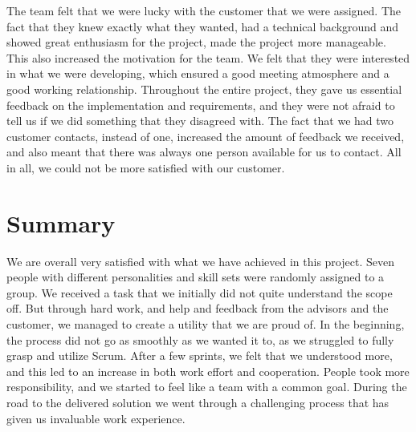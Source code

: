 The team felt that we were lucky with the customer that we were assigned.
The fact that they knew exactly what they wanted, had a technical background and showed great enthusiasm for the project, made the project more manageable. This also increased the motivation for the team. We felt that they were interested in what we were developing, which ensured a good meeting atmosphere and a good working relationship. Throughout the entire project, they gave us essential feedback on the implementation and requirements, and they were not afraid to tell us if we did something that they disagreed with. The fact that we had two customer contacts, instead of one, increased the amount of feedback we received, and also meant that there was always one person available for us to contact. All in all, we could not be more satisfied with our customer.

\section{Summary}
We are overall very satisfied with what we have achieved in this project. Seven people with different personalities and skill sets were randomly assigned to a group. We received a task that we initially did not quite understand the scope off. But through hard work, and help and feedback from the advisors and the customer, we managed to create a utility that we are proud of. In the beginning, the process did not go as smoothly as we wanted it to, as we struggled to fully grasp and utilize Scrum. After a few sprints, we felt that we understood more, and this led to an increase in both work effort and cooperation. People took more responsibility, and we started to feel like a team with a common goal. During the road to the delivered solution we went through
a challenging process that has given us invaluable work experience.


